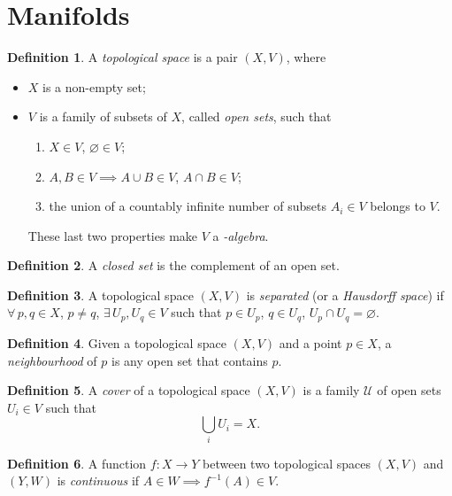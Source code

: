 \documentclass[a4paper,12pt]{book}
\theoremstyle{definition}
\newtheorem{definition}{Definition}
\theoremstyle{remark}
\newcommand{\tuple}[1]{({#1})}
\begin{document}
\section{Manifolds}

\begin{definition}
A \emph{topological space} is a pair $\tuple{X,V}$, where
\begin{itemize}
\item $X$ is a non-empty set;
\item $V$ is a family of subsets of $X$, called \emph{open sets}, such that
\begin{enumerate}
\item $X\in V$, $\varnothing\in V$;
\item $A,B\in V\implies A\cup B\in V$, $A\cap B\in V$;
\item the union of a countably infinite number of subsets $A_i\in V$ belongs to $V$.
\end{enumerate}
These last two properties make $V$ a \emph{\sigma-algebra}.
\end{itemize}
\end{definition}

\begin{definition}
A \emph{closed set} is the complement of an open set.
\end{definition}

\begin{definition}
A topological space $\tuple{X,V}$ is \emph{separated} (or a \emph{Hausdorff space}) if $\forall\, p,q\in X$, $p\ne q$, $\exists\, U_p,U_q\in V$ such that $p\in U_p$, $q\in U_q$, $U_p\cap U_q=\varnothing$.
\end{definition}

\begin{definition}
Given a topological space $\tuple{X,V}$ and a point $p\in X$, a \emph{neighbourhood} of $p$ is any open set that contains $p$.
\end{definition}

\begin{definition}
A \emph{cover} of a topological space $\tuple{X,V}$ is a family $\mathcal U$ of open sets $U_i\in V$ such that
\[\bigcup_i U_i=X.\]
\end{definition}

\begin{definition}
A function $f\colon X\to Y$ between two topological spaces $\tuple{X,V}$ and $\tuple{Y,W}$ is \emph{continuous} if $A\in W\implies f^{-1}(A)\in V$.
\end{definition}
\end{document}
